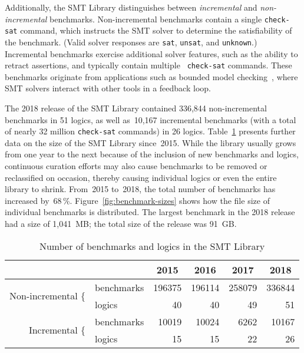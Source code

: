 \documentclass[twoside,11pt]{article}
\begin{document}
Additionally, the SMT Library distinguishes between \emph{incremental}
and \emph{non-incremental} benchmarks.  Non-incremental benchmarks
contain a single {\tt check-sat} command, which instructs the SMT
solver to determine the satisfiability of the benchmark.  (Valid
solver responses are {\tt sat}, {\tt unsat}, and {\tt unknown}.)
Incremental benchmarks exercise additional solver features, such as
the ability to retract assertions, and typically contain multiple {\tt
  check-sat} commands.  These benchmarks originate from applications
such as bounded model
checking~\cite{Gunther:2014:IBS:2632362.2632374}, where SMT solvers
interact with other tools in a feedback loop.

The 2018 release of the SMT Library contained 336,844 non-incremental
benchmarks in 51 logics, as well as~10,167 incremental benchmarks
(with a total of nearly 32 million {\tt check-sat} commands) in 26
logics.  Table~\ref{table:smtlib} presents further data on the size of
the SMT Library since~2015.  While the library usually grows from one
year to the next because of the inclusion of new benchmarks and
logics, continuous curation efforts may also cause benchmarks to be
removed or reclassified on occasion, thereby causing individual logics
or even the entire library to shrink.  From~2015 to~2018, the total
number of benchmarks has increased by~68\,\%.
Figure~\ref{fig:benchmark-sizes} shows how the file size of individual
benchmarks is distributed.  The largest benchmark in the 2018 release
had a size of 1,041~MB; the total size of the release was 91~GB.

\begin{table}
  \caption{Number of benchmarks and logics in the SMT Library}
  \label{table:smtlib}
  \centering
  \begin{tabular}{|r@{\ \ }l|r|r|r|r|}
    \hline
                               & & \multicolumn{1}{c|}{2015} & \multicolumn{1}{c|}{2016} & \multicolumn{1}{c|}{2017} & \multicolumn{1}{c|}{2018} \\
    \hline
    \multirow{2}{*}{Non-incremental $\{$} & benchmarks & 196375 & 196114 & 258079 & 336844 \\
                                          & logics     &     40 &     40 &     49 &     51 \\
    \multirow{2}{*}{Incremental $\{$}     & benchmarks &  10019 &  10024 &   6262 &  10167 \\
                                          & logics     &     15 &     15 &     22 &     26 \\
    \hline
  \end{tabular}
\end{table}
\end{document}
